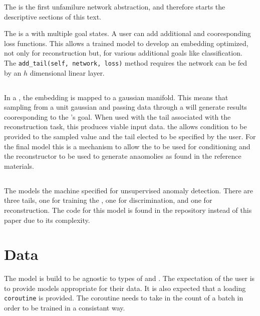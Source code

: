 \documentclass{article}
\begin{document}
\begin{multicols}{2}
The \gumiho is the first unfamilure network abstraction, and therefore starts the descriptive
sections of this text.

The \gumiho is a \vae with multiple goal states. A user can add additional 
and cooresponding loss functions. This allows a trained model to develop an embedding
optimized, not only for reconstruction but, for various additional goals like classification.
The \texttt{add\_tail(self, network, loss)} method requires the network can be fed by an $h$
dimensional linear layer.




\subsection{\condgen}

In a \vae, the embedding is mapped to a gaussian manifold. This means that sampling from
a unit gaussian and passing data through a \decoder will generate results cooresponding to the
\decoder's goal. When used with the tail associated with the reconstruction task, this produces
viable input data. the \condgen allows condition to be provided to the sampled value and the
tail elected to be specified by the user. For the final model this is a mechanism to allow the
\GMM to be used for conditioning and the reconstructor to be used to generate anaomolies
as found in the reference materials.



\subsection{\desc}

The \desc models the machine specified\cite{1810.09133} for unsupervised anomaly detection.
There are three tails, one for training the \GMM, one for discrimination, and one for
reconstruction. The code for this model is found in the repository instead of this paper due
to its complexity.

\section{Data}

The model is build to be agnostic to types of \encoder and \decoder. The expectation of the
user is to provide models appropriate for their data. It is also expected that a loading
\texttt{coroutine} is provided. The coroutine needs to take in the count of a batch in order
to be trained in a consistant way.


\end{multicols}
\end{document}
